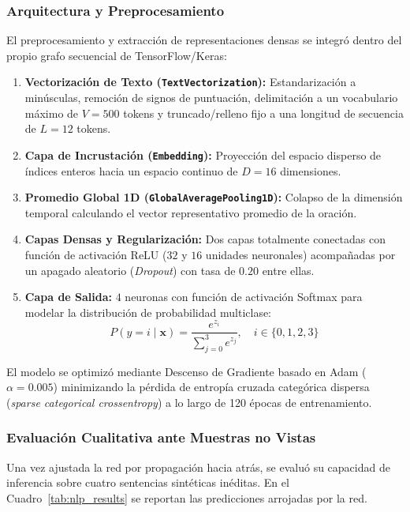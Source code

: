 \documentclass[12pt]{article}
\begin{document}
\subsubsection{Arquitectura y Preprocesamiento}
El preprocesamiento y extracción de representaciones densas se integró dentro del propio grafo secuencial de TensorFlow/Keras:
\begin{enumerate}
	\item \textbf{Vectorización de Texto (\texttt{TextVectorization}):} Estandarización a minúsculas, remoción de signos de puntuación, delimitación a un vocabulario máximo de $V = 500$ tokens y truncado/relleno fijo a una longitud de secuencia de $L = 12$ tokens.
	\item \textbf{Capa de Incrustación (\texttt{Embedding}):} Proyección del espacio disperso de índices enteros hacia un espacio continuo de $D = 16$ dimensiones.
	\item \textbf{Promedio Global 1D (\texttt{GlobalAveragePooling1D}):} Colapso de la dimensión temporal calculando el vector representativo promedio de la oración.
	\item \textbf{Capas Densas y Regularización:} Dos capas totalmente conectadas con función de activación ReLU ($32$ y $16$ unidades neuronales) acompañadas por un apagado aleatorio (\textit{Dropout}) con tasa de $0.20$ entre ellas.
	\item \textbf{Capa de Salida:} $4$ neuronas con función de activación Softmax para modelar la distribución de probabilidad multiclase:
	\begin{equation}
		P(y = i \mid \mathbf{x}) = \frac{e^{z_i}}{\sum_{j=0}^{3} e^{z_j}}, \quad i \in \{0, 1, 2, 3\}
	\end{equation}
\end{enumerate}

El modelo se optimizó mediante Descenso de Gradiente basado en Adam ($\alpha = 0.005$) minimizando la pérdida de entropía cruzada categórica dispersa (\textit{sparse categorical crossentropy}) a lo largo de 120 épocas de entrenamiento.

\subsubsection{Evaluación Cualitativa ante Muestras no Vistas}
Una vez ajustada la red por propagación hacia atrás, se evaluó su capacidad de inferencia sobre cuatro sentencias sintéticas inéditas. En el Cuadro~\ref{tab:nlp_results} se reportan las predicciones arrojadas por la red.
\end{document}
